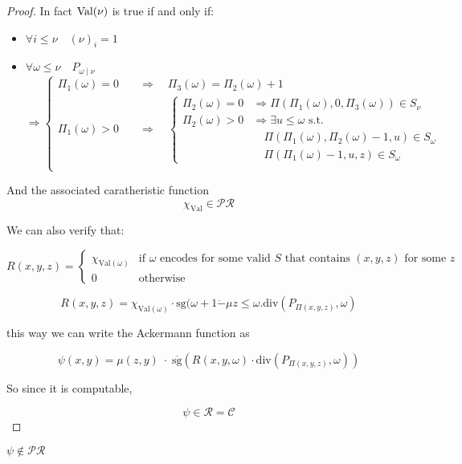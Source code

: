 \begin{theorem}
\begin{proof}
    In fact $\text{Val}(\nu)$ is true if and only if:
    \begin{itemize}
    \item \(\forall i \leq \nu \quad (\nu)_i = 1\)
    \item{
        \( \forall \omega \leq \nu \quad P_{\omega \; | \; \nu}\) \\
        \[\Rightarrow \begin{cases}
            \Pi_1(\omega) = 0 \quad & \Rightarrow
            \quad \Pi_3(\omega) = \Pi_2(\omega) + 1 \\
            \Pi_1(\omega) > 0 \quad & \Rightarrow \quad
            \begin{cases}
              \Pi_2(\omega) = 0 & \Rightarrow
              \Pi(\Pi_1(\omega),0,\Pi_3(\omega)) \in S_\nu \\
              \Pi_2(\omega) > 0 & \Rightarrow
              \exists u \leq \omega \text{ s.t. } \\
              & \quad \Pi(\Pi_1(\omega), \Pi_2(\omega)-1,u) \in S_\omega \\
              & \quad \Pi(\Pi_1(\omega)-1, u,z) \in S_\omega 
            \end{cases}
            \\
          \end{cases}
        \]
      }
    \end{itemize}

    And the associated caratheristic function
    \[\chi_{\text{Val}} \in \mathcal{PR}\]

    We can also verify that:

    \[
      R(x,y,z) = \begin{cases}

        \chi_{\text{Val}(\omega)} & \text{if $\omega$ encodes for some
          valid $S$ that contains $(x,y,z)$ for some $z$} \\

        0 & \text{otherwise}
        
      \end{cases}
    \]

    \[
      R(x,y,z) = \chi_{\text{Val}(\omega)} \cdot \text{sg} (\omega + 1
      \dot{-} \mu z \leq \omega . \text{div}(P_{\Pi(x,y,z)}, \omega)
    \]

    this way we can write the Ackermann function as

    \[
      \psi(x,y) = \mu (z,y) \; \cdot \; \overline{\text{sg}}(R(x,y,\omega)
      \cdot \text{div}(P_{\Pi(x,y,z)}, \omega))
    \]

    So since it is computable,

    \[
      \psi \in \mathcal{R} = \mathcal{C}
    \]

  \end{proof}
\end{theorem}

\begin{theorem}{$\psi \notin \mathcal{PR}$}

\end{theorem}

